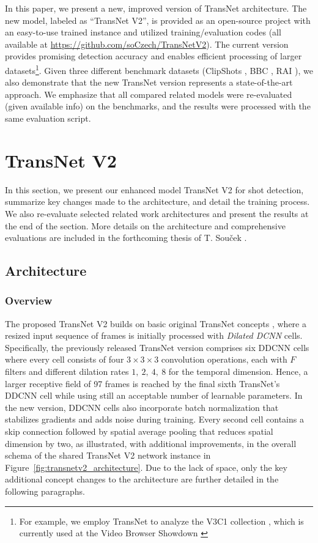 \documentclass[sigconf]{acmart}
\begin{document}
In this paper, we present a new, improved version of TransNet architecture. The new model, labeled as ``TransNet V2'', is provided as an open-source project with an easy-to-use trained instance and utilized training/evaluation codes (all available at \url{https://github.com/soCzech/TransNetV2}). The current version provides promising detection accuracy and enables efficient processing of larger datasets\footnote{For example, we employ TransNet to analyze the V3C1 collection \cite{V3C}, which is currently used at the Video Browser Showdown \cite{9037125}}. Given three different benchmark datasets (ClipShots \cite{Tang2018clipshots}, BBC \cite{Baraldi2015SceneSiamDet_BBC}, RAI \cite{Baraldi15RAI}), we also demonstrate that the new TransNet version represents a state-of-the-art approach. We  emphasize that all compared related models were re-evaluated (given available info) on the benchmarks, and the results were processed with the same evaluation script.





\section{TransNet V2}
In this section, we present our enhanced model TransNet V2 for shot detection, summarize key changes made to the architecture, and detail the training process. We also re-evaluate selected related work architectures and present the results at the end of the section.
More details on the architecture and comprehensive evaluations are included in the forthcoming thesis of T. Sou\v{c}ek \cite{soucek2020}.


\subsection{Architecture}
\subsubsection{Overview}
The proposed TransNet V2 builds on basic original TransNet concepts \cite{transnet}, where a resized input sequence of frames is initially processed with \emph{Dilated DCNN} cells. Specifically, the previously released TransNet version comprises six DDCNN cells where every cell consists of four $3 \times 3 \times 3$ convolution operations, each with $F$ filters and different dilation rates $1,\ 2,\ 4,\ 8$ for the temporal dimension. Hence, a larger receptive field of 97 frames is reached by the final sixth TransNet's DDCNN cell while using still an acceptable number of learnable parameters. In the new version, DDCNN cells also incorporate batch normalization that stabilizes gradients and adds noise during training. Every second cell contains a skip connection followed by spatial average pooling that reduces spatial dimension by two, as illustrated, with additional improvements, in the overall schema of the shared TransNet V2 network instance in Figure~\ref{fig:transnetv2_architecture}. Due to the lack of space, only the key additional concept changes to the architecture are further detailed in the following paragraphs.
\end{document}
